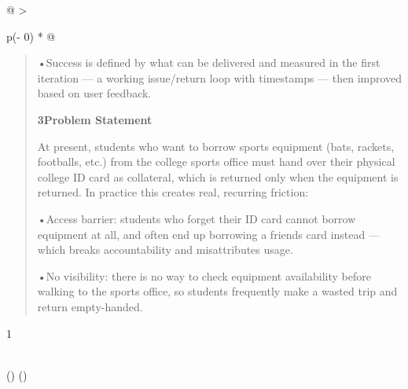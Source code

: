 \documentclass[
]{article}
\begin{document}
\begin{longtable}[]{@{}
  >{\raggedright\arraybackslash}p{(\columnwidth - 0\tabcolsep) * }@{}}
\begin{minipage}[b]{\linewidth}
\begin{quote}
•Success is defined by what can be delivered and measured in the first
iteration --- a working issue/return loop with timestamps --- then
improved based on user feedback.

\textbf{3Problem Statement}

At present, students who want to borrow sports equipment (bats, rackets,
footballs, etc.) from the college sports office must hand over their
physical college ID card as collateral, which is returned only when the
equipment is returned. In practice this creates real, recurring
friction:

•Access barrier: students who forget their ID card cannot borrow
equipment at all, and often end up borrowing a friend\textquotesingle s
card instead --- which breaks accountability and misattributes usage.

•No visibility: there is no way to check equipment availability before
walking to the sports office, so students frequently make a wasted trip
and return empty-handed.
\end{quote}

1\strut
\end{minipage} \\
\midrule()
\endhead
\bottomrule()
\end{longtable}
\end{document}
